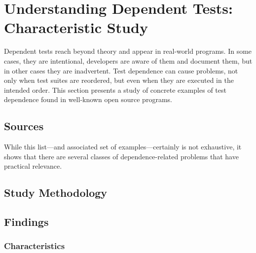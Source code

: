 \section{Understanding Dependent Tests: Characteristic Study}
\label{sec:study}

Dependent tests reach beyond theory and appear in real-world programs.  
In some cases, they are intentional, developers are aware of them and
document them, but in other cases they are inadvertent. 
Test dependence can cause problems, not only when test suites are reordered,
but even when they are
executed in the intended order.
This section presents a study of concrete examples of test dependence found in
well-known open source programs. 

\subsection{Sources}


While this list---and associated set of examples---certainly is not exhaustive, it shows that there are
several classes of dependence-related problems that have practical
relevance.

\subsection{Study Methodology}

\subsection{Findings}

\subsubsection{Characteristics}



